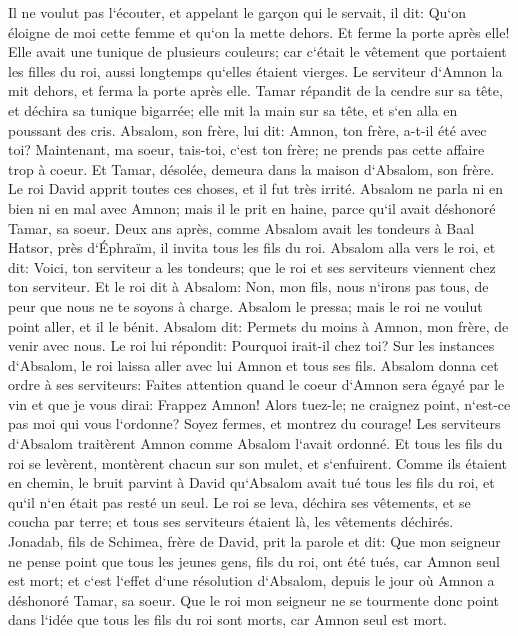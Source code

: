 \verse Il ne voulut pas l`écouter, et appelant le garçon qui le servait, il dit: Qu`on éloigne de moi cette femme et qu`on la mette dehors. Et ferme la porte après elle! 
\verse Elle avait une tunique de plusieurs couleurs; car c`était le vêtement que portaient les filles du roi, aussi longtemps qu`elles étaient vierges. Le serviteur d`Amnon la mit dehors, et ferma la porte après elle. 
\verse Tamar répandit de la cendre sur sa tête, et déchira sa tunique bigarrée; elle mit la main sur sa tête, et s`en alla en poussant des cris. 
\verse Absalom, son frère, lui dit: Amnon, ton frère, a-t-il été avec toi? Maintenant, ma soeur, tais-toi, c`est ton frère; ne prends pas cette affaire trop à coeur. Et Tamar, désolée, demeura dans la maison d`Absalom, son frère. 
\verse Le roi David apprit toutes ces choses, et il fut très irrité. 
\verse Absalom ne parla ni en bien ni en mal avec Amnon; mais il le prit en haine, parce qu`il avait déshonoré Tamar, sa soeur. 
\verse Deux ans après, comme Absalom avait les tondeurs à Baal Hatsor, près d`Éphraïm, il invita tous les fils du roi. 
\verse Absalom alla vers le roi, et dit: Voici, ton serviteur a les tondeurs; que le roi et ses serviteurs viennent chez ton serviteur. 
\verse Et le roi dit à Absalom: Non, mon fils, nous n`irons pas tous, de peur que nous ne te soyons à charge. Absalom le pressa; mais le roi ne voulut point aller, et il le bénit. 
\verse Absalom dit: Permets du moins à Amnon, mon frère, de venir avec nous. Le roi lui répondit: Pourquoi irait-il chez toi? 
\verse Sur les instances d`Absalom, le roi laissa aller avec lui Amnon et tous ses fils. 
\verse Absalom donna cet ordre à ses serviteurs: Faites attention quand le coeur d`Amnon sera égayé par le vin et que je vous dirai: Frappez Amnon! Alors tuez-le; ne craignez point, n`est-ce pas moi qui vous l`ordonne? Soyez fermes, et montrez du courage! 
\verse Les serviteurs d`Absalom traitèrent Amnon comme Absalom l`avait ordonné. Et tous les fils du roi se levèrent, montèrent chacun sur son mulet, et s`enfuirent. 
\verse Comme ils étaient en chemin, le bruit parvint à David qu`Absalom avait tué tous les fils du roi, et qu`il n`en était pas resté un seul. 
\verse Le roi se leva, déchira ses vêtements, et se coucha par terre; et tous ses serviteurs étaient là, les vêtements déchirés. 
\verse Jonadab, fils de Schimea, frère de David, prit la parole et dit: Que mon seigneur ne pense point que tous les jeunes gens, fils du roi, ont été tués, car Amnon seul est mort; et c`est l`effet d`une résolution d`Absalom, depuis le jour où Amnon a déshonoré Tamar, sa soeur. 
\verse Que le roi mon seigneur ne se tourmente donc point dans l`idée que tous les fils du roi sont morts, car Amnon seul est mort. 
